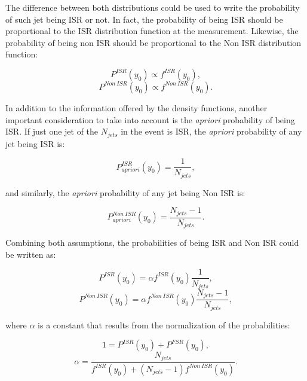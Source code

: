\documentclass[12pt, oneside]{book}              %
\begin{document}
The difference between both distributions could be used to write the probability of such jet being
ISR or not. In fact, the probability of being ISR should be proportional to the ISR distribution
function at the measurement. Likewise, the probability of being non ISR should be proportional to
the Non ISR distribution function:

\begin{equation} \label{eq:Prob_ISR_1}
P^{ISR}(y_0) \propto f^{ISR}(y_0),
\end{equation}
\begin{equation} \label{eq:Prob_Non_ISR_1}
P^{Non\ ISR}(y_0) \propto f^{Non\ ISR}(y_0).
\end{equation}

In addition to the information offered by the density functions, another important 
consideration to take into account is the \textit{apriori} probability of being ISR. If just one
jet of the $ N_{jets} $ in the event is ISR, the \textit{apriori} probability of any jet being ISR is:

\begin{equation} \label{eq:Prob_ISR_2}
P^{ISR}_{apriori}(y_0) = \frac{1}{N_{jets}},
\end{equation}

\noindent and similarly, the \textit{apriori} probability of any jet being Non ISR is:

\begin{equation} \label{eq:Prob_Non_ISR_2}
P^{Non\ ISR}_{apriori}(y_0) = \frac{N_{jets}-1}{N_{jets}}.
\end{equation}

Combining both assumptions, the probabilities of being ISR and Non ISR could be written as:

\begin{equation} \label{eq:Prob_ISR_3}
P^{ISR}(y_0) = \alpha f^{ISR}(y_0) \frac{1}{N_{jets}},
\end{equation}
\begin{equation} \label{eq:Prob_Non_ISR_3}
P^{Non\ ISR}(y_0) = \alpha f^{Non\ ISR}(y_0) \frac{N_{jets}-1}{N_{jets}},
\end{equation}

\noindent where $ \alpha $ is a constant that results from the normalization of the probabilities:

\begin{equation} \label{eq:Normalization}
1 = P^{ISR}(y_0) + P^{FSR}(y_0),
\end{equation}
\begin{equation} \label{eq:alpha}
\alpha = \dfrac{N_{jets}}{f^{ISR}(y_0)+(N_{jets}-1)f^{Non\ ISR}(y_0)}.
\end{equation}
\end{document}
